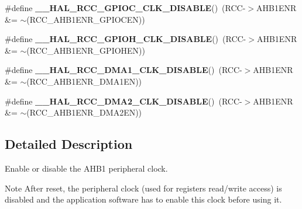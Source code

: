 \begin{DoxyCompactItemize}
\item 
\mbox{\label{group___r_c_c___a_h_b1___clock___enable___disable_ga0fc90c25d35f9b5b5f66961505de1cd4}} 
\#define {\bfseries \+\_\+\+\_\+\+H\+A\+L\+\_\+\+R\+C\+C\+\_\+\+G\+P\+I\+O\+C\+\_\+\+C\+L\+K\+\_\+\+D\+I\+S\+A\+B\+LE}()~(R\+CC-\/$>$A\+H\+B1\+E\+NR \&= $\sim$(R\+C\+C\+\_\+\+A\+H\+B1\+E\+N\+R\+\_\+\+G\+P\+I\+O\+C\+EN))
\item 
\mbox{\label{group___r_c_c___a_h_b1___clock___enable___disable_ga1eb7dd0a520cef518fb624bf7117b7e1}} 
\#define {\bfseries \+\_\+\+\_\+\+H\+A\+L\+\_\+\+R\+C\+C\+\_\+\+G\+P\+I\+O\+H\+\_\+\+C\+L\+K\+\_\+\+D\+I\+S\+A\+B\+LE}()~(R\+CC-\/$>$A\+H\+B1\+E\+NR \&= $\sim$(R\+C\+C\+\_\+\+A\+H\+B1\+E\+N\+R\+\_\+\+G\+P\+I\+O\+H\+EN))
\item 
\mbox{\label{group___r_c_c___a_h_b1___clock___enable___disable_ga569dc8b9e178a8afab2664fdf87f46c5}} 
\#define {\bfseries \+\_\+\+\_\+\+H\+A\+L\+\_\+\+R\+C\+C\+\_\+\+D\+M\+A1\+\_\+\+C\+L\+K\+\_\+\+D\+I\+S\+A\+B\+LE}()~(R\+CC-\/$>$A\+H\+B1\+E\+NR \&= $\sim$(R\+C\+C\+\_\+\+A\+H\+B1\+E\+N\+R\+\_\+\+D\+M\+A1\+EN))
\item 
\mbox{\label{group___r_c_c___a_h_b1___clock___enable___disable_gaa97383d7ee14e9a638eb8c9ba35658f0}} 
\#define {\bfseries \+\_\+\+\_\+\+H\+A\+L\+\_\+\+R\+C\+C\+\_\+\+D\+M\+A2\+\_\+\+C\+L\+K\+\_\+\+D\+I\+S\+A\+B\+LE}()~(R\+CC-\/$>$A\+H\+B1\+E\+NR \&= $\sim$(R\+C\+C\+\_\+\+A\+H\+B1\+E\+N\+R\+\_\+\+D\+M\+A2\+EN))
\end{DoxyCompactItemize}


\subsection{Detailed Description}
Enable or disable the A\+H\+B1 peripheral clock. 

\begin{DoxyNote}{Note}
After reset, the peripheral clock (used for registers read/write access) is disabled and the application software has to enable this clock before using it. 
\end{DoxyNote}


